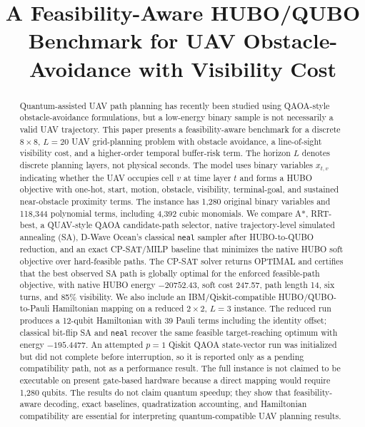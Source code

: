 \documentclass[10pt,conference]{IEEEtran}
\title{A Feasibility-Aware HUBO/QUBO Benchmark for UAV Obstacle-Avoidance with Visibility Cost}
\author{\IEEEauthorblockN{Author names to be finalized}
\IEEEauthorblockA{Affiliations to be finalized\\
Email: to be finalized}}
\begin{document}
\maketitle

\begin{abstract}
Quantum-assisted UAV path planning has recently been studied using QAOA-style obstacle-avoidance formulations, but a low-energy binary sample is not necessarily a valid UAV trajectory. This paper presents a feasibility-aware benchmark for a discrete $8\times8$, $L=20$ UAV grid-planning problem with obstacle avoidance, a line-of-sight visibility cost, and a higher-order temporal buffer-risk term. The horizon $L$ denotes discrete planning layers, not physical seconds. The model uses binary variables $x_{t,v}$ indicating whether the UAV occupies cell $v$ at time layer $t$ and forms a HUBO objective with one-hot, start, motion, obstacle, visibility, terminal-goal, and sustained near-obstacle proximity terms. The instance has 1,280 original binary variables and 118,344 polynomial terms, including 4,392 cubic monomials. We compare A*, RRT-best, a QUAV-style QAOA candidate-path selector, native trajectory-level simulated annealing (SA), D-Wave Ocean's classical \texttt{neal} sampler after HUBO-to-QUBO reduction, and an exact CP-SAT/MILP baseline that minimizes the native HUBO soft objective over hard-feasible paths. The CP-SAT solver returns OPTIMAL and certifies that the best observed SA path is globally optimal for the enforced feasible-path objective, with native HUBO energy $-20752.43$, soft cost 247.57, path length 14, six turns, and 85\% visibility. We also include an IBM/Qiskit-compatible HUBO/QUBO-to-Pauli Hamiltonian mapping on a reduced $2\times2$, $L=3$ instance. The reduced run produces a 12-qubit Hamiltonian with 39 Pauli terms including the identity offset; classical bit-flip SA and \texttt{neal} recover the same feasible target-reaching optimum with energy $-195.4477$. An attempted $p=1$ Qiskit QAOA state-vector run was initialized but did not complete before interruption, so it is reported only as a pending compatibility path, not as a performance result. The full instance is not claimed to be executable on present gate-based hardware because a direct mapping would require 1,280 qubits. The results do not claim quantum speedup; they show that feasibility-aware decoding, exact baselines, quadratization accounting, and Hamiltonian compatibility are essential for interpreting quantum-compatible UAV planning results.
\end{abstract}
\end{document}
